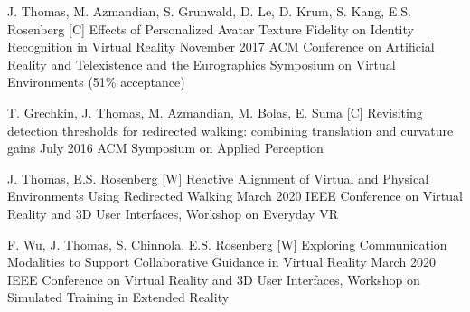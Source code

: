 \begin{cvpubs}
  \cvpub
    {J. Thomas, M. Azmandian, S. Grunwald, D. Le, D. Krum, S. Kang, E.S. Rosenberg} %
    {[C\thenpubs] Effects of Personalized Avatar Texture Fidelity on Identity Recognition in Virtual Reality} %
    {November 2017} %
    {ACM Conference on Artificial Reality and Telexistence and the Eurographics Symposium on Virtual Environments (51\% acceptance)} %
    
  \cvpub
    {T. Grechkin, J. Thomas, M. Azmandian, M. Bolas, E. Suma} %
    {[C\thenpubs] Revisiting detection thresholds for redirected walking: combining translation and curvature gains} %
    {July 2016} %
    {ACM Symposium on Applied Perception} %
\end{cvpubs}
   
\setcounter{npubs}{1}
\begin{cvpubs}  
  \cvpub
    {J. Thomas, E.S. Rosenberg} %
    {[W\thenpubs] Reactive Alignment of Virtual and Physical Environments Using Redirected Walking} %
    {March 2020} %
    {IEEE Conference on Virtual Reality and 3D User Interfaces, Workshop on Everyday VR} %
    
  \cvpub
    {F. Wu, J. Thomas, S. Chinnola, E.S. Rosenberg} %
    {[W\thenpubs] Exploring Communication Modalities to Support Collaborative Guidance in Virtual Reality} %
    {March 2020} %
    {IEEE Conference on Virtual Reality and 3D User Interfaces, Workshop on Simulated Training in Extended Reality} %
\end{cvpubs}    
    
